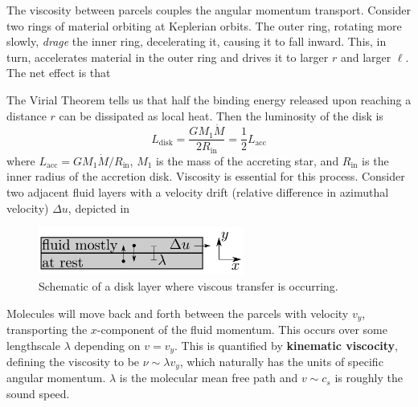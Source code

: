 \documentclass[10pt]{article}
\numberwithin{equation}{section}
\newcommand{\n}{\noindent}
\begin{document}
	\n The viscosity between parcels couples the angular momentum transport. Consider two rings of material orbiting at Keplerian orbits. The outer ring, rotating more slowly, \emph{drage} the inner ring, decelerating it, causing it to fall inward. This, in turn, accelerates material in the outer ring and drives it to larger $r$ and larger $\ell$. The net effect is that
	\begin{center}
	\end{center}
	The Virial Theorem tells us that half the binding energy released upon reaching a distance $r$ can be dissipated as local heat. Then the luminosity of the disk is 
	\begin{equation}
		\label{eq:disk:3} L_{\mathrm{disk}} = \frac{GM_1\dot{M}}{2R_{\mathrm{in}}} = \frac{1}{2} L_{\mathrm{acc}}
	\end{equation}
	where $L_{\mathrm{acc}} = G M_1\dot{M}/R_{\mathrm{in}}$, $M_1$ is the mass of the accreting star, and $R_{\mathrm{in}}$ is the inner radius of the accretion disk. Viscosity is essential for this process. Consider two adjacent fluid layers with a velocity drift (relative difference in azimuthal velocity) $\Delta u$, depicted in %
	\begin{figure}
		\centering
		\includegraphics[width = 0.6\textwidth]{figures/disk_layers.pdf}
		\caption{Schematic of a disk layer where viscous transfer is occurring.}
		\label{fig:disk:1}
	\end{figure}
	Molecules will move back and forth between the parcels with velocity $v_y$, transporting the $x$-component of the fluid momentum. This occurs over some lengthscale $\lambda$ depending on $v=v_y$. This is quantified by \textbf{kinematic viscocity}, defining the viscosity to be $\nu\sim \lambda v_y$, which naturally has the units of specific angular momentum. $\lambda$ is the molecular mean free path and $v\sim c_s$ is roughly the sound speed.\\
	
\end{document}
